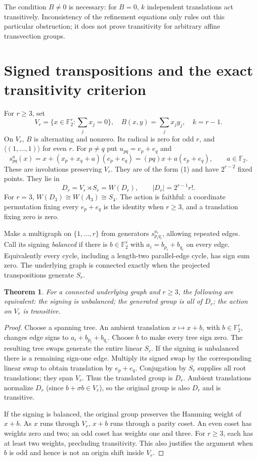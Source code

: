 \documentclass[11pt]{article}
\newtheorem{theorem}{Theorem}
\newcommand{\F}{\mathbb F}
\begin{document}
The condition $B\ne0$ is necessary: for $B=0$, $k$ independent translations
act transitively. Inconsistency of the refinement equations only rules out
this particular obstruction; it does not prove transitivity for arbitrary
affine transvection groups.

\section{Signed transpositions and the exact transitivity criterion}

For $r\ge3$, set
\[
 V_r=\{x\in\F_2^r:\textstyle\sum_jx_j=0\},\quad
 B(x,y)=\textstyle\sum_jx_jy_j,\quad k=r-1.
\]
On $V_r$, $B$ is alternating and nonzero. Its radical is zero for odd $r$,
and $\langle(1,\ldots,1)\rangle$ for even $r$.
For $p\ne q$ put $u_{pq}=e_p+e_q$ and
\[
 s_{pq}^a(x)=x+(x_p+x_q+a)(e_p+e_q)
            =(pq)x+a(e_p+e_q),\qquad a\in\F_2.          \tag{2}
\]
These are involutions preserving $V_r$. They are of the form (1) and have
$2^{r-2}$ fixed points. They lie in
\[
 D_r=V_r\rtimes S_r=W(D_r),\qquad |D_r|=2^{r-1}r!.
\]
For $r=3$, $W(D_3)\cong W(A_3)\cong S_4$.
The action is faithful: a coordinate permutation fixing every $e_p+e_q$
is the identity when $r\ge3$, and a translation fixing zero is zero.

Make a multigraph on $\{1,\ldots,r\}$ from generators $s_{p_iq_i}^{a_i}$,
allowing repeated edges. Call its signing \emph{balanced} if there is
$b\in\F_2^r$ with $a_i=b_{p_i}+b_{q_i}$ on every edge. Equivalently every
cycle, including a length-two parallel-edge cycle, has sign sum zero.
The underlying graph is connected exactly when the projected transpositions
generate $S_r$.

\begin{theorem}\label{thm:signedgraph}
For a connected underlying graph and $r\ge3$, the following are equivalent:
the signing is unbalanced; the generated group is all of $D_r$; the action
on $V_r$ is transitive.
\end{theorem}
\begin{proof}
Choose a spanning tree. An ambient translation $x\mapsto x+b$, with
$b\in\F_2^r$, changes edge signs to $a_i+b_{p_i}+b_{q_i}$.
Choose $b$ to make every tree sign zero. The resulting tree swaps generate
the entire linear $S_r$. If the signing is unbalanced there is a remaining
sign-one edge. Multiply its signed swap by the corresponding linear swap
to obtain translation by $e_p+e_q$. Conjugation by $S_r$ supplies all
root translations; they span $V_r$. Thus the translated group is $D_r$.
Ambient translations normalize $D_r$ (since $b+\sigma b\in V_r$), so the
original group is also $D_r$ and is transitive.

If the signing is balanced, the original group preserves the Hamming
weight of $x+b$. As $x$ runs through $V_r$, $x+b$ runs through a parity
coset. An even coset has weights zero and two; an odd coset has weights
one and three. For $r\ge3$, each has at least two weights, precluding
transitivity. This also justifies the argument when $b$ is odd and hence
is not an origin shift inside $V_r$.
\end{proof}
\end{document}
